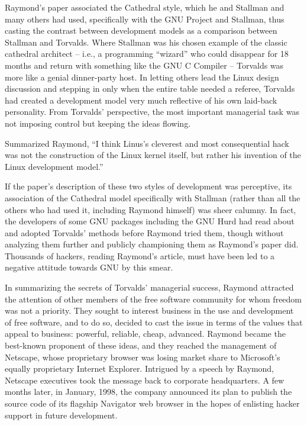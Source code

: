 \ifdefined\chs

\fi

\ifdefined\eng
Raymond's paper associated the Cathedral style, which he and Stallman and many others had used, specifically with the GNU Project and Stallman, thus casting the contrast between development models as a comparison between Stallman and Torvalds. Where Stallman was his chosen example of the classic cathedral architect -- i.e., a programming ``wizard'' who could disappear for 18 months and return with something like the GNU C Compiler -- Torvalds was more like a genial dinner-party host. In letting others lead the Linux design discussion and stepping in only when the entire table needed a referee, Torvalds had created a development model very much reflective of his own laid-back personality. From Torvalds' perspective, the most important managerial task was not imposing control but keeping the ideas flowing.
\fi

\ifdefined\chs

\fi

\ifdefined\eng
Summarized Raymond, ``I think Linus's cleverest and most consequential hack was not the construction of the Linux kernel itself, but rather his invention of the Linux development model.''
\fi

\ifdefined\chs

\fi

\ifdefined\eng
If the paper's description of these two styles of development was perceptive, its association of the Cathedral model specifically with Stallman (rather than all the others who had used it, including Raymond himself) was sheer calumny.  In fact, the developers of some GNU packages including the GNU Hurd had read about and adopted Torvalds' methods before Raymond tried them, though without analyzing them further and publicly championing them as Raymond's paper did. Thousands of hackers, reading Raymond's article, must have been led to a negative attitude towards GNU by this smear.
\fi

\ifdefined\chs

\fi

\ifdefined\eng
In summarizing the secrets of Torvalds' managerial success, Raymond attracted the attention of other members of the free software community for whom freedom was not a priority.  They sought to interest business in the use and development of free software, and to do so, decided to cast the issue in terms of the values that appeal to business: powerful, reliable, cheap, advanced.  Raymond became the best-known proponent of these ideas, and they reached the management of Netscape, whose proprietary browser was losing market share to Microsoft's equally proprietary Internet Explorer.  Intrigued by a speech by Raymond, Netscape executives took the message back to corporate headquarters. A few months later, in January, 1998, the company announced its plan to publish the source code of its flagship Navigator web browser in the hopes of enlisting hacker support in future development.
\fi

